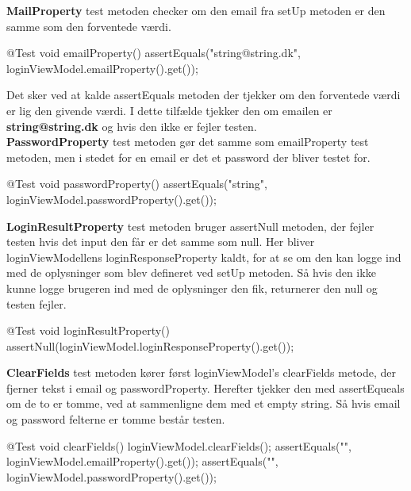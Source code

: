 \textbf{MailProperty} test metoden checker om den email fra setUp metoden er den samme som den forventede værdi.\\


\begin{code}[caption=LoginViewModel.jar, firstnumber=34]
@Test
void emailProperty() {
    assertEquals("string@string.dk", loginViewModel.emailProperty().get());
}
\end{code}

Det sker ved at kalde assertEquals metoden der tjekker om den forventede værdi er lig den givende værdi. I dette tilfælde tjekker den om emailen er \textbf{string@string.dk} og hvis den ikke er fejler testen.\\
    
\textbf{PasswordProperty} test metoden gør det samme som emailProperty test metoden, men i stedet for en email er det et password der bliver testet for.\\
\begin{code}[caption=LoginViewModel.jar, firstnumber=39]
@Test
void passwordProperty() {
    assertEquals("string", loginViewModel.passwordProperty().get());
}
\end{code}
    
\textbf{LoginResultProperty} test metoden bruger assertNull metoden, der fejler testen hvis det input den får er det samme som null. Her bliver loginViewModellens loginResponseProperty kaldt, for at se om den kan logge ind med de oplysninger som blev defineret ved setUp metoden. Så hvis den ikke kunne logge brugeren ind med de oplysninger den fik, returnerer den null og testen fejler.\\

\begin{code}[caption=LoginViewModel.jar, firstnumber=44]
@Test
void loginResultProperty() {
    assertNull(loginViewModel.loginResponseProperty().get());
}
\end{code}
    
\textbf{ClearFields} test metoden kører først loginViewModel’s clearFields metode, der fjerner tekst i email og passwordProperty. Herefter tjekker den med assertEqueals om de to er tomme, ved at sammenligne dem med et empty string. Så hvis email og password felterne er tomme består testen.\\

\begin{code}[caption=LoginViewModel.jar, firstnumber=49]
@Test
void clearFields() {
    loginViewModel.clearFields();
    assertEquals("", loginViewModel.emailProperty().get());
    assertEquals("", loginViewModel.passwordProperty().get());
}
\end{code}

